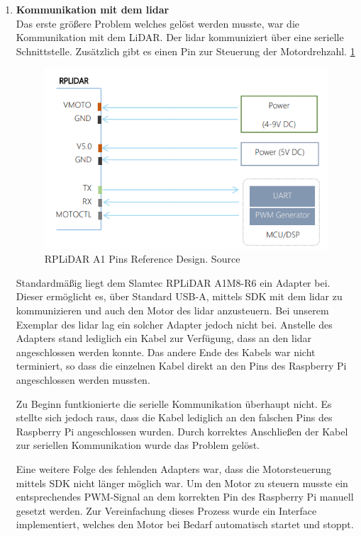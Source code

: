 \begin{enumerate}[leftmargin=*]
    \item \textbf{Kommunikation mit dem \ac{lidar}} \\
    Das erste größere Problem welches gelöst werden musste, war die Kommunikation mit dem LiDAR.
    Der \ac{lidar} kommuniziert über eine serielle Schnittstelle.
    Zusätzlich gibt es einen Pin zur Steuerung der Motordrehzahl. \ref{fig:lidar_pins}

    \begin{figure}[H]
        \centering
        \includegraphics[width=12cm]{graphics/lidar_pin_layout.png}
        \caption{RPLiDAR A1 Pins Reference Design. Source \cite[p. 12]{Slamtec2023} }
        \label{fig:lidar_pins}
    \end{figure}

    Standardmäßig liegt dem Slamtec RPLiDAR A1M8-R6 ein Adapter bei.
    Dieser ermöglicht es, über Standard USB-A, mittels SDK mit dem \ac{lidar} zu kommunizieren und auch den Motor des \ac{lidar} anzusteuern.
    Bei unserem Exemplar des \ac{lidar} lag ein solcher Adapter jedoch nicht bei.
    Anstelle des Adapters stand lediglich ein Kabel zur Verfügung, dass an den \ac{lidar} angeschlossen werden konnte.
    Das andere Ende des Kabels war nicht terminiert, so dass die einzelnen Kabel direkt an den Pins des Raspberry Pi angeschlossen werden mussten.

    Zu Beginn funtkionierte die serielle Kommunikation überhaupt nicht.
    Es stellte sich jedoch raus, dass die Kabel lediglich an den falschen Pins des Raspberry Pi angeschlossen wurden.
    Durch korrektes Anschließen der Kabel zur seriellen Kommunikation wurde das Problem gelöst.

    Eine weitere Folge des fehlenden Adapters war, dass die Motorsteuerung mittels SDK nicht länger möglich war.
    Um den Motor zu steuern musste ein entsprechendes PWM-Signal an dem korrekten Pin des Raspberry Pi manuell gesetzt werden.
    Zur Vereinfachung dieses Prozess wurde ein Interface implementiert, welches den Motor bei Bedarf automatisch startet und stoppt.


\end{enumerate}
